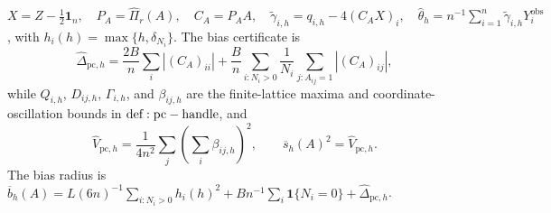 \(X=Z-\tfrac12\mathbf1_n,\quad P_A=\widehat\Pi_r(A),\quad C_A=P_AA,\quad \widetilde\gamma_{i,h}=q_{i,h}-4(C_AX)_i,\quad \widehat\theta_h=n^{-1}\sum_{i=1}^n\widetilde\gamma_{i,h}Y_i^{\mathrm{obs}}\), with \(h_i(h)=\max\{h,\delta_{N_i}\}\).  The bias certificate is
\[
 \widehat\Delta_{\mathrm{pc},h}=\frac{2B}{n}\sum_i|(C_A)_{ii}|+\frac{B}{n}\sum_{i:N_i>0}\frac1{N_i}\sum_{j:A_{ij}=1}|(C_A)_{ij}|,
\]
while \(Q_{i,h}\), \(D_{ij,h}\), \(\Gamma_{i,h}\), and \(\beta_{ij,h}\) are the finite-lattice maxima and coordinate-oscillation bounds in \({\rm def:pc-handle}\), and
\[
 \widehat V_{\mathrm{pc},h}=\frac1{4n^2}\sum_j\left(\sum_i\beta_{ij,h}\right)^2,
 \qquad
 \overline s_h(A)^2=\widehat V_{\mathrm{pc},h}.
\]
The bias radius is \(\overline b_h(A)=L(6n)^{-1}\sum_{i:N_i>0}h_i(h)^2+Bn^{-1}\sum_i\mathbf1\{N_i=0\}+\widehat\Delta_{\mathrm{pc},h}\).
